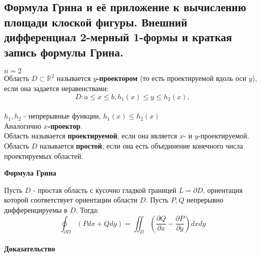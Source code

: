 \subsection{Формула Грина и её приложение к вычислению площади клоской фигуры. Внешний дифференциал 2-мерный 1-формы и краткая запись формулы Грина.}
$n = 2$\\
    Область $D \subset \mathbb{R}^2$ называется \textbf{$y$-проектором} (то есть проектируемой вдоль оси $y$), если она задается неравенствами:\\
    $$D:  a \leq x \leq b, h_1(x)\leq y \leq h_2(x),$$\\
    $h_1, h_2$ - непрерывные функции, $h_1(x) \leq h_2(x)$\\
    Аналогично \textbf{$x$-проектор}.\\
    Область называется \textbf{проектируемой}, если она является $x$- и $y$-проектируемой.\\
    Область $D$ называется \textbf{простой}, если она есть объединение конечного числа проектируемых областей.\\
    \begin{center}
        \textbf{Формула Грина}
    \end{center}
    Пусть $D$ - простая область с кусочно гладкой границей $L = \partial D$, ориентация которой соответствует ориентации области $D$. Пусть $P, Q$ непрерывно дифференцируемы в $D$. Тогда:\\
    $$\oint_{\partial D} (P dx + Q dy) = \iint_D (\frac{\partial Q}{\partial x} - \frac{\partial P}{\partial y})dx dy$$\\
    \textbf{Доказательство} \vartriangleright \\
    
